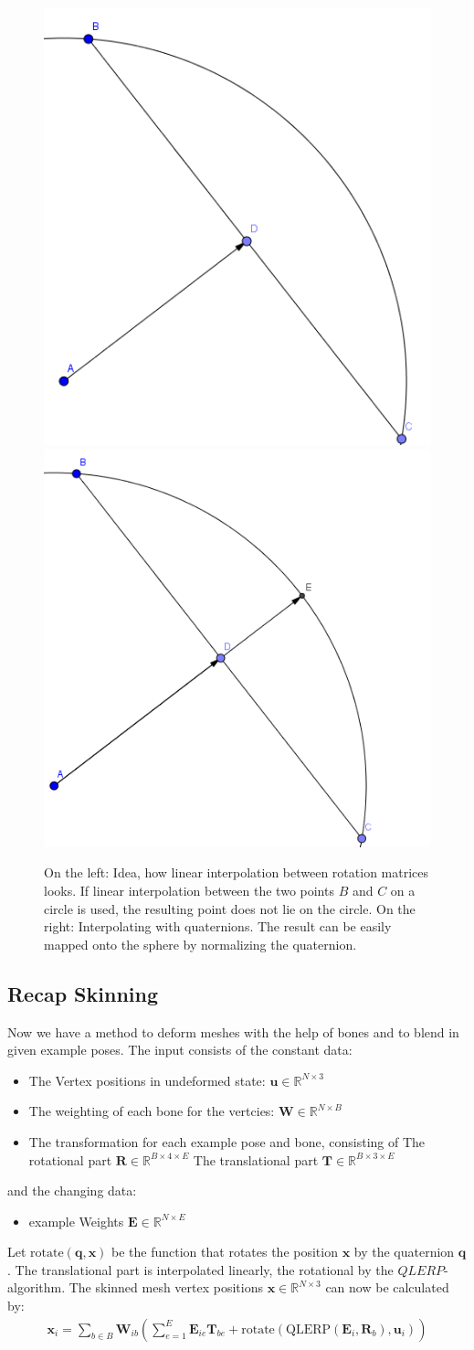\begin{figure}[tb]
	\centering
	\includegraphics[width=0.3\linewidth]{images/quatrot1} 
	\includegraphics[width=0.33\linewidth]{images/quatrot2} 
	\caption{\label{fig:image} On the left: Idea, how linear interpolation between rotation matrices looks. If linear interpolation between the two points $B$ and $C$ on a circle is used, the resulting point does not lie on the circle. On the right: Interpolating with quaternions. The result can be easily mapped onto the sphere by normalizing the quaternion.
	}
\end{figure}


\subsection{Recap Skinning}
Now we have a method to deform meshes with the help of bones and to blend in given example poses.
The input consists of the constant data:
\begin{itemize}
\item The Vertex positions in undeformed state: $\bm u\in\mathbb{R}^{N\times 3}$
\item The weighting of each bone for the vertcies: $\bm W\in\mathbb{R} ^{N \times B}$
\item The transformation for each example pose and bone, consisting of
	\subitem The rotational part $\bm R\in\mathbb{R}^{B\times 4\times  E}$
	\subitem The translational part $\bm T\in\mathbb{R}^{B \times 3\times E}$
\end{itemize}
and the changing data:
\begin{itemize}
	\item example Weights $\bm{E}\in\mathbb{R}^{N\times E}$
\end{itemize}
Let $\text{rotate} (\bm{q},\bm{x})$ be the function that rotates the position $\bm{x}$ by the quaternion $\bm{q}$.
The translational part is interpolated linearly, the rotational by the $QLERP$-algorithm.
The skinned mesh vertex positions $\bm{x} \in \mathbb{R}^{N\times 3}$ can now be calculated by:
\begin{align}
\bm{x}_i = \sum_{b\in B} \bm{W}_{ib}\left(\sum_{e=1}^{E}\bm{E}_{ie}\bm{T}_{be} + \text{rotate}(\text{QLERP}(\bm{E}_i,\bm{R}_b),\bm{u}_i)\right)
\end{align}
